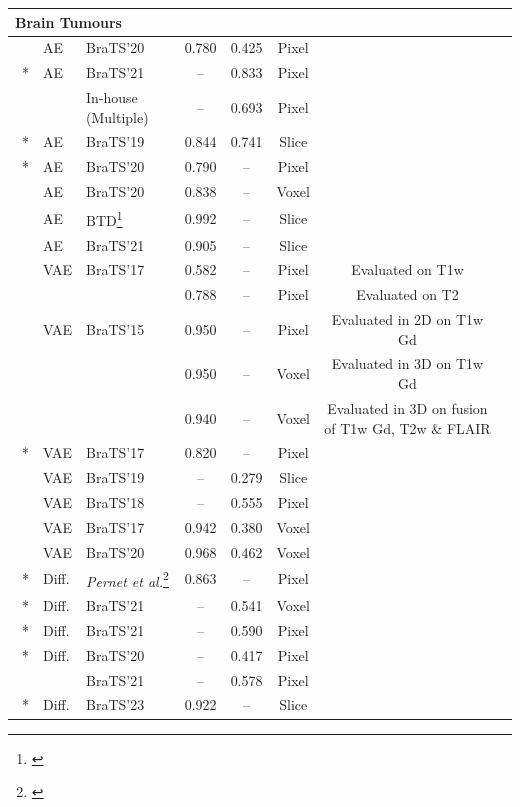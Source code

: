 \begin{longtable}{lp{1.2cm}lccccp{4.5cm}}
\multicolumn{7}{l}{\textbf{Brain Tumours}} \\
\midrule
\citet{Ghorbel2023} & AE & BraTS'20 & 0.780 & 0.425 & Pixel & \\
\citet{Kascenas2023}~* & AE & BraTS'21 & -- & 0.833 & Pixel & \\
 & & In-house (Multiple) & -- & 0.693 & Pixel & \\
\citet{Luo2023}~* & AE & BraTS'19 & 0.844 & 0.741 & Slice & \\
\citet{Meissen2023}~* & AE & BraTS'20 & 0.790 & -- & Pixel & \\
\citet{Jimenez-Garcia2024} & AE & BraTS'20 & 0.838 & -- & Voxel & \\
\citet{Lu2024} & AE & BTD\footnote{\citet{Cheng2017}} & 0.992 & -- & Slice &\\
\citet{Qu2026} & AE & BraTS'21 & 0.905 & -- & Slice & \\
\citet{Sato2019} & VAE & BraTS'17 & 0.582 & -- & Pixel & {\footnotesize Evaluated on T1w}\\
 & & & 0.788 & -- & Pixel & {\footnotesize Evaluated on T2}\\
\citet{Uzunova2019} & VAE & BraTS'15 & 0.950 & -- & Pixel & {\footnotesize Evaluated in 2D on T1w Gd}\\
 & & & 0.950 & -- & Voxel & {\footnotesize Evaluated in 3D on T1w Gd}\\
 & & & 0.940 & -- & Voxel & {\footnotesize Evaluated in 3D on fusion of T1w Gd, T2w \& FLAIR}\\
\citet{Zimmerer2019}~* & VAE & BraTS'17 & 0.820 & -- & Pixel & \\
\citet{Bengs2021} & VAE & BraTS'19 & -- & 0.279 & Slice & \\
\citet{Pinaya2022-2} & VAE & BraTS'18 & -- & 0.555 & Pixel & \\
\citet{Lüth2023} & VAE &  BraTS'17 & 0.942 & 0.380 & Voxel & \\
\citet{Wijanarko2024} & VAE & BraTS'20 & 0.968 & 0.462 & Voxel & \\
\citet{Wyatt2022}~* & Diff. & \textit{Pernet et al.}\footnote{\citet{Pernet2016}}  & 0.863 & -- & Pixel & \\
\citet{Behrendt2023}~* & Diff. & BraTS'21 & -- & 0.541 & Voxel & \\
\citet{Iqbal2023}~* & Diff. & BraTS'21 & -- & 0.590 & Pixel & \\
\citet{Kumar2024}~* & Diff. & BraTS'20 & -- & 0.417 & Pixel & \\
 & & BraTS'21 & -- & 0.578 & Pixel & \\
\citet{Bi2025}~* & Diff. & BraTS'23 & 0.922 & -- & Slice & \\
\hline


\end{longtable}
